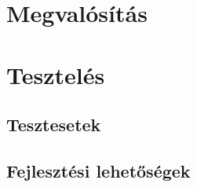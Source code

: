 \section{Megvalósítás}

\section{Tesztelés}

\subsection{Tesztesetek}

\subsection{Fejlesztési lehetőségek}